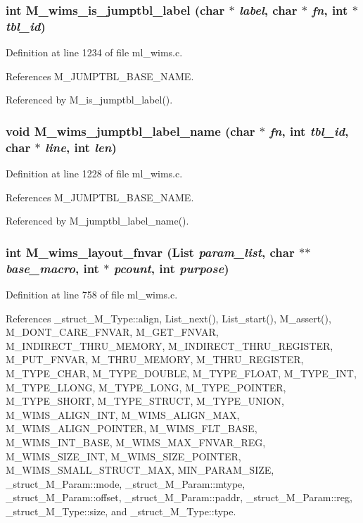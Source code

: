 \subsubsection{\setlength{\rightskip}{0pt plus 5cm}int M\_\-wims\_\-is\_\-jumptbl\_\-label (char $\ast$ {\em label}, char $\ast$ {\em fn}, int $\ast$ {\em tbl\_\-id})}\label{m__wims_8h_fabc9fa87765b3760076768f573c5724}




Definition at line 1234 of file ml\_\-wims.c.

References M\_\-JUMPTBL\_\-BASE\_\-NAME.

Referenced by M\_\-is\_\-jumptbl\_\-label().
\subsubsection{\setlength{\rightskip}{0pt plus 5cm}void M\_\-wims\_\-jumptbl\_\-label\_\-name (char $\ast$ {\em fn}, int {\em tbl\_\-id}, char $\ast$ {\em line}, int {\em len})}\label{m__wims_8h_2aee614b4f83be73ddbbab47e7632e3d}




Definition at line 1228 of file ml\_\-wims.c.

References M\_\-JUMPTBL\_\-BASE\_\-NAME.

Referenced by M\_\-jumptbl\_\-label\_\-name().
\subsubsection{\setlength{\rightskip}{0pt plus 5cm}int M\_\-wims\_\-layout\_\-fnvar (\bf{List} {\em param\_\-list}, char $\ast$$\ast$ {\em base\_\-macro}, int $\ast$ {\em pcount}, int {\em purpose})}\label{m__wims_8h_89f126df7c79a4237631ff3654f631d0}




Definition at line 758 of file ml\_\-wims.c.

References \_\-struct\_\-M\_\-Type::align, List\_\-next(), List\_\-start(), M\_\-assert(), M\_\-DONT\_\-CARE\_\-FNVAR, M\_\-GET\_\-FNVAR, M\_\-INDIRECT\_\-THRU\_\-MEMORY, M\_\-INDIRECT\_\-THRU\_\-REGISTER, M\_\-PUT\_\-FNVAR, M\_\-THRU\_\-MEMORY, M\_\-THRU\_\-REGISTER, M\_\-TYPE\_\-CHAR, M\_\-TYPE\_\-DOUBLE, M\_\-TYPE\_\-FLOAT, M\_\-TYPE\_\-INT, M\_\-TYPE\_\-LLONG, M\_\-TYPE\_\-LONG, M\_\-TYPE\_\-POINTER, M\_\-TYPE\_\-SHORT, M\_\-TYPE\_\-STRUCT, M\_\-TYPE\_\-UNION, M\_\-WIMS\_\-ALIGN\_\-INT, M\_\-WIMS\_\-ALIGN\_\-MAX, M\_\-WIMS\_\-ALIGN\_\-POINTER, M\_\-WIMS\_\-FLT\_\-BASE, M\_\-WIMS\_\-INT\_\-BASE, M\_\-WIMS\_\-MAX\_\-FNVAR\_\-REG, M\_\-WIMS\_\-SIZE\_\-INT, M\_\-WIMS\_\-SIZE\_\-POINTER, M\_\-WIMS\_\-SMALL\_\-STRUCT\_\-MAX, MIN\_\-PARAM\_\-SIZE, \_\-struct\_\-M\_\-Param::mode, \_\-struct\_\-M\_\-Param::mtype, \_\-struct\_\-M\_\-Param::offset, \_\-struct\_\-M\_\-Param::paddr, \_\-struct\_\-M\_\-Param::reg, \_\-struct\_\-M\_\-Type::size, and \_\-struct\_\-M\_\-Type::type.

